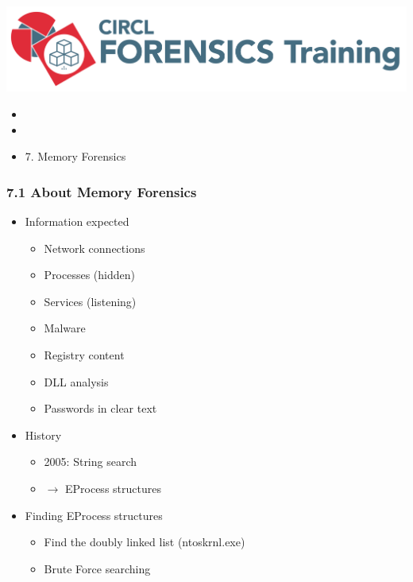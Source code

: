 %
%



\begin{frame}
    \includegraphics[scale=0.3]{images/logo-circl-Forensics.png}
    \begin{itemize}
        \item[]
        \item[]
        \item[] 7. Memory Forensics
    \end{itemize}
\end{frame}


\begin{frame}
  \frametitle{7.1 About Memory Forensics}
    \begin{itemize}
        \item Information expected
            \begin{itemize}
                \item Network connections
		\item Processes (hidden)
		\item Services (listening)
                \item Malware
                \item Registry content
                \item DLL analysis
                \item Passwords in clear text
            \end{itemize}
        \item History
            \begin{itemize}
                \item 2005: String search
		\item $\to$ EProcess structures
            \end{itemize}
        \item Finding EProcess structures
            \begin{itemize}
		\item Find the doubly linked list (ntoskrnl.exe)
		\item Brute Force searching
            \end{itemize}
    \end{itemize}
\end{frame}


